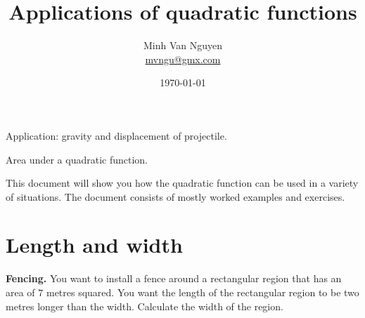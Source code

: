 \documentclass[a4paper,oneside,12pt]{article}
\begin{document}
\title{\Large\bf Applications of quadratic functions}
\author{%
  Minh Van Nguyen \\
  \url{mvngu@gmx.com}
}
\date{\today}
\maketitle


\begin{packeditem}
\item Application: gravity and displacement of projectile.

\item Area under a quadratic function.
\end{packeditem}

This document will show you how the quadratic function can be used in
a variety of situations.  The document consists of mostly worked
examples and exercises.



\section{Length and width}

\begin{example}
\textbf{Fencing.}
\label{ex:fence_a_rectangular_region}
You want to install a fence around a rectangular region that has an
area of $7$ metres squared.  You want the length of the rectangular
region to be two metres longer than the width.  Calculate the width of
the region.
\end{example}
\end{document}
